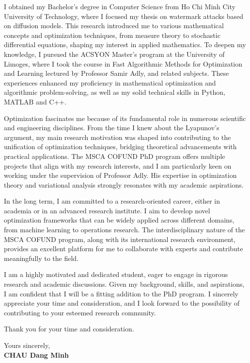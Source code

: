 \documentclass[11pt]{report}
\begin{document}
\begin{titlepage}
    I obtained my Bachelor's degree in Computer Science from Ho Chi Minh City University of Technology, where I focused my thesis on watermark attacks based on diffusion models. This research introduced me to various mathematical concepts and optimization techniques, from measure theory to stochastic differential equations, shaping my interest in applied mathematics. To deepen my knowledge, I pursued the ACSYON Master's program at the University of Limoges, where I took the course in Fast Algorithmic Methods for Optimization and Learning lectured by Professor Samir Adly, and related subjects. These experiences enhanced my proficiency in mathematical optimization and algorithmic problem-solving, as well as my solid technical skills in Python, MATLAB and C++.

    \vspace{0.7em}

    Optimization fascinates me because of its fundamental role in numerous scientific and engineering disciplines. From the time I knew about the Lyapunov's argument, my main research motivation was shaped into contributing to the unification of optimization techniques, bridging theoretical advancements with practical applications. The MSCA COFUND PhD program offers multiple projects that align with my research interests, and I am particularly keen on working under the supervision of Professor Adly. His expertise in optimization theory and variational analysis strongly resonates with my academic aspirations.

    \vspace{0.7em}

    In the long term, I am committed to a research-oriented career, either in academia or in an advanced research institute. I aim to develop novel optimization frameworks that can be widely applied across different domains, from machine learning to operations research. The interdisciplinary nature of the MSCA COFUND program, along with its international research environment, provides an excellent platform for me to collaborate with experts and contribute meaningfully to the field.

    \vspace{0.7em}

    I am a highly motivated and dedicated student, eager to engage in rigorous research and academic discussions. Given my background, skills, and aspirations, I am confident that I will be a fitting addition to the PhD program. I sincerely appreciate your time and consideration, and I look forward to the possibility of contributing to your esteemed research community.

    \vspace{0.7em}

    Thank you for your time and consideration.

    \vspace{0.7em}

    \raggedright Yours sincerely,\\
    \textbf{CHAU Dang Minh}

\end{titlepage}
\end{document}
